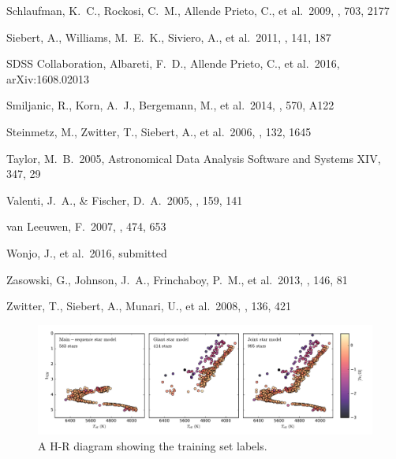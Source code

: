 \documentclass[preprint,trackchanges]{aastex}
\begin{document}
\begin{thebibliography}{dummy}
 Schlaufman, K.~C., Rockosi, C.~M., Allende Prieto, C., et al.\ 2009, \apj, 703, 2177 

 Siebert, A., Williams, M.~E.~K., Siviero, A., et al.\ 2011, \aj, 141, 187 

 SDSS Collaboration, Albareti, F.~D., Allende Prieto, C., et al.\ 2016, arXiv:1608.02013 

 Smiljanic, R., Korn, A.~J., Bergemann, M., et al.\ 2014, \aap, 570, A122 

 Steinmetz, M., Zwitter, T., Siebert, A., et al.\ 2006, \aj, 132, 1645 

 Taylor, M.~B.\ 2005, Astronomical Data Analysis Software and Systems XIV, 347, 29 

 Valenti, J.~A., \& Fischer, D.~A.\ 2005, \apjs, 159, 141 

 van Leeuwen, F.\ 2007, \aap, 474, 653 

 Wonjo, J., et al.\ 2016, submitted

 Zasowski, G., Johnson, J.~A., Frinchaboy, P.~M., et al.\ 2013, \aj, 146, 81 

 Zwitter, T., Siebert, A., Munari, U., et al.\ 2008, \aj, 136, 421 

\end{thebibliography}

\clearpage

\begin{figure}[p]
\includegraphics[width=\textwidth]{figures/hrd-train-set.pdf}
\caption{A H-R diagram showing the training set labels.\label{fig:training-set-hrd}}
\end{figure}
\end{document}
